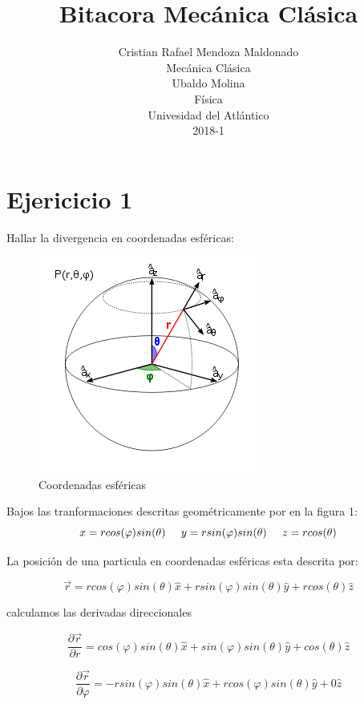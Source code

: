 \documentclass[12 pt]{article}
\title{Bitacora Mecánica Clásica}
\date{Cristian Rafael Mendoza Maldonado\\ Mecánica Clásica\\Ubaldo Molina \\Física\\Univesidad del Atlántico\\2018-1}
\begin{document}
\maketitle


\section*{Ejericicio 1}
Hallar la divergencia en coordenadas esféricas:


\begin{figure}[H]
	\centering
	\includegraphics[scale= 0.6]{imagenes/a2.png}
	\caption{Coordenadas esféricas}
	\label{esfera}
\end{figure}


Bajos las tranformaciones descritas geométricamente por en la figura 1:
\begin{equation*}
x = r cos(\varphi) sin(\theta)  \hspace{0.5cm}
y = r sin (\varphi)sin(\theta) \hspace{0.5cm}
z = r cos(\theta)
\end{equation*}

La posición de una particula en coordenadas esféricas  esta descrita por: 

\begin{equation*}
\vec{r}= r cos(\varphi) sin(\theta)\hat{x}+ rsin (\varphi) sin(\theta) \hat{y} + r cos(\theta)\hat{z}
\end{equation*}

calculamos las derivadas direccionales 

\begin{equation*}
\frac{\partial \vec{r}}{\partial r} = cos(\varphi) sin (\theta) \hat{x} + 	sin (\varphi) sin(\theta) \hat{y} + cos(\theta)\hat{z}
\end{equation*}


\begin{equation*}
\frac{\partial \vec{r}}{\partial \varphi} =-r sin(\varphi)sin(\theta) \hat{x} + r cos(\varphi) sin(\theta
) \hat{y} + 0 \hat{z}
\end{equation*}
\end{document}
